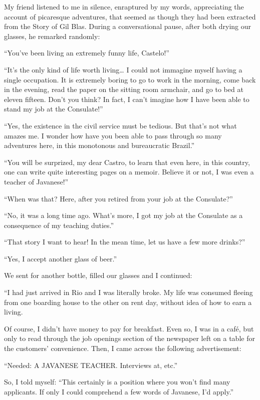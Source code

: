 \documentclass[a4paper,12pt]{book}
\begin{document}
My friend listened to me in silence,
enraptured by my words,
appreciating the account of picaresque adventures,
that seemed as though they had been
extracted from the Story of Gil Blas.
During a conversational pause,
after both drying our glasses,
he remarked randomly:

``You've been living an extremely funny life, Castelo!''

``It's the only kind of life worth living\ldots
I could not immagine
myself having a single occupation.
It is extremely boring
to go to work in the morning,
come back in the evening, read the paper
on the sitting room armchair,
and go to bed at eleven fifteen.
Don't you think?
In fact, I can't imagine how I have been
able to stand my job at the Consulate!''


``Yes, the existence in the civil service
must be tedious. But that's not
what amazes me. I wonder how have you been
able to pass through so many adventures here,
in this monotonous and bureaucratic Brazil.''

``You will be surprized, my dear Castro,
to learn that even here, in this country,
one can write quite interesting pages on a
memoir. Believe it or not,
I was even a teacher of Javanese!''

``When was that? Here, after you retired
from your job at the Consulate?''


``No, it was a long time ago.
What's more, I got my job at the
Consulate as a consequence of my
teaching duties.''

``That story I want to hear! In the mean time,
let us have a few more drinks?''

``Yes, I accept another glass of beer.''

We sent for another bottle, filled our glasses
and I continued:

``I had just arrived in Rio and I was literally broke.
My life was consumed fleeing
from one boarding house to
the other on rent day, without
idea of how to earn a living.

Of course, I didn't have money
to pay for breakfast.
Even so, I was in a café, but only to
read through the job openings section
of the newspaper left on a table
for the customers' convenience. Then, I came across
the following advertisement:


``Needed: A JAVANESE TEACHER.  Interviews at, etc.''

So, I told myself: ``This certainly is a position
where you won't find many applicants. If only I
could comprehend a few words of Javanese,
I'd apply.''
\end{document}

